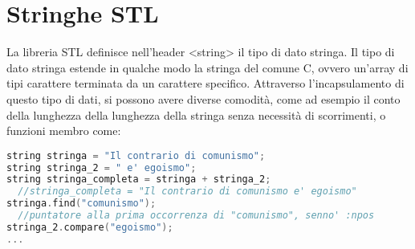 \documentclass[a4paper,12pt]{article}
\begin{document}
\section{Stringhe STL}
La libreria STL definisce nell'header <string> il tipo di dato stringa. Il tipo di dato stringa estende in qualche
modo la stringa del comune C, ovvero un'array di tipi carattere terminata da un carattere specifico. Attraverso l'incapsulamento
di questo tipo di dati, si possono avere diverse comodità, come ad esempio il conto della lunghezza della lunghezza della stringa
senza necessità di scorrimenti, o funzioni membro come:
\begin{lstlisting}[language=C++]
string stringa = "Il contrario di comunismo";
string stringa_2 = " e' egoismo";
string stringa_completa = stringa + stringa_2; 
  //stringa_completa = "Il contrario di comunismo e' egoismo"
stringa.find("comunismo"); 
  //puntatore alla prima occorrenza di "comunismo", senno' :npos
stringa_2.compare("egoismo");
...
\end{lstlisting}
\end{document}
